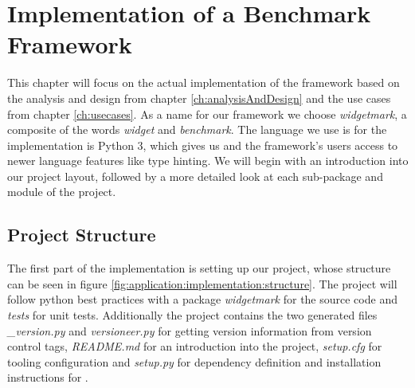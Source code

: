 
\chapter{Implementation of a Benchmark Framework}

\label{ch:implementation}

This chapter will focus on the actual implementation of the framework based on
the analysis and design from chapter \ref{ch:analysisAndDesign} and the use
cases from chapter \ref{ch:usecases}. As a name for our framework we choose
\emph{widgetmark}, a composite of the words \emph{widget} and \emph{benchmark}.
The language we use is for the implementation is Python 3, which gives us and
the framework's users access to newer language features like type hinting. We
will begin with an introduction into our project layout, followed by a more
detailed look at each sub-package and module of the project.





\section{Project Structure}

The first part of the implementation is setting up our project, whose structure
can be seen in figure \ref{fig:application:implementation:structure}. The
project will follow python best practices with a package \emph{widgetmark} for
the source code and \emph{tests} for unit tests. Additionally the project
contains the two generated files \emph{\_version.py} and \emph{versioneer.py}
for getting version information from version control tags, \emph{README.md} for
an introduction into the project, \emph{setup.cfg} for tooling configuration and
\emph{setup.py} for dependency definition and installation instructions for
.

